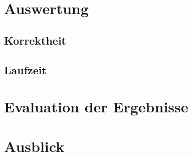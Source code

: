\documentclass[10pt,a4paper,draft]{article}
\begin{document}
\section{Auswertung}

\subsection{Korrektheit}
 
\subsection{Laufzeit}
 
\section{Evaluation der Ergebnisse}

\section{Ausblick}
\end{document}
